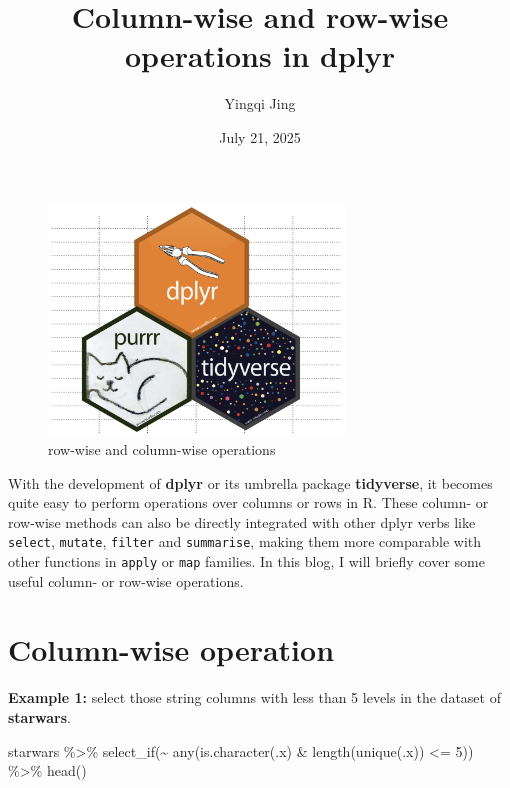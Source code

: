 \documentclass[
  letterpaper,
  DIV=11,
  numbers=noendperiod]{scrartcl}
\title{Column-wise and row-wise operations in dplyr}
\author{Yingqi Jing}
\date{July 21, 2025}
\newenvironment{Shaded}{}{}
\newcommand{\DecValTok}[1]{\textcolor[rgb]{0.60,0.41,0.00}{#1}}
\newcommand{\FunctionTok}[1]{\textcolor[rgb]{0.25,0.47,0.95}{#1}}
\newcommand{\NormalTok}[1]{\textcolor[rgb]{0.22,0.23,0.26}{#1}}
\newcommand{\SpecialCharTok}[1]{\textcolor[rgb]{0.00,0.52,0.74}{#1}}
\renewcommand*\contentsname{Table of contents}
\newcommand\contentsname{Table of contents}
\begin{document}
\maketitle

\renewcommand*\contentsname{Contents}
{
\hypersetup{linkcolor=}
\setcounter{tocdepth}{4}
\tableofcontents
}
\listoffigures
\listoftables

\clearpage

\begin{figure}[H]

{\centering \includegraphics[width=0.7\textwidth,height=0.7\textheight]{logos/dplyrlogs.png}

}

\caption{row-wise and column-wise operations}

\end{figure}%

With the development of \textbf{dplyr} or its umbrella package
\textbf{tidyverse}, it becomes quite easy to perform operations over
columns or rows in R. These column- or row-wise methods can also be
directly integrated with other dplyr verbs like \texttt{select},
\texttt{mutate}, \texttt{filter} and \texttt{summarise}, making them
more comparable with other functions in \texttt{apply} or \texttt{map}
families. In this blog, I will briefly cover some useful column- or
row-wise operations.

\section{Column-wise operation}\label{column-wise-operation}

\textbf{Example 1:} select those string columns with less than 5 levels
in the dataset of \textbf{starwars}.

\begin{Shaded}
\begin{Highlighting}[]
\NormalTok{starwars }\SpecialCharTok{\%\textgreater{}\%}
  \FunctionTok{select\_if}\NormalTok{(}\SpecialCharTok{\textasciitilde{}} \FunctionTok{any}\NormalTok{(}\FunctionTok{is.character}\NormalTok{(.x) }\SpecialCharTok{\&} \FunctionTok{length}\NormalTok{(}\FunctionTok{unique}\NormalTok{(.x)) }\SpecialCharTok{\textless{}=} \DecValTok{5}\NormalTok{)) }\SpecialCharTok{\%\textgreater{}\%} 
  \FunctionTok{head}\NormalTok{()}
\end{Highlighting}
\end{Shaded}
\end{document}
